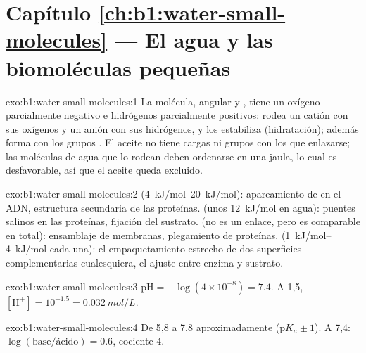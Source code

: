 \section*{Capítulo \ref{ch:b1:water-small-molecules} --- El agua y las biomoléculas pequeñas}

\begin{solution}{exo:b1:water-small-molecules:1}
La molécula, angular y , tiene un oxígeno parcialmente negativo e
hidrógenos parcialmente positivos: rodea un catión con sus oxígenos y un
anión con sus hidrógenos, y los estabiliza (hidratación); además forma
 con los grupos . El aceite no tiene cargas ni
grupos  con los que enlazarse; las moléculas de agua que lo rodean
deben ordenarse en una jaula, lo cual es desfavorable, así que el aceite
queda excluido.
\end{solution}

\begin{solution}{exo:b1:water-small-molecules:2}
 (\qtyrange{4}{20}{kJ/mol}): apareamiento de  en el
ADN, estructura secundaria de las proteínas.  (unos
\qty{12}{kJ/mol} en agua): puentes salinos en las proteínas, fijación del
sustrato.  (no es un enlace, pero es comparable en total):
ensamblaje de membranas, plegamiento de proteínas. 
(\qtyrange{1}{4}{kJ/mol} cada una): el empaquetamiento estrecho de dos
superficies complementarias cualesquiera, el ajuste entre enzima y
sustrato.
\end{solution}

\begin{solution}{exo:b1:water-small-molecules:3}
$\mathrm{pH} = -\log(4\times 10^{-8}) = 7.4$. A  1,5,
$[\mathrm{H^+}] = 10^{-1.5} = \qty{0.032}{mol/L}$.
\end{solution}

\begin{solution}{exo:b1:water-small-molecules:4}
De 5,8 a 7,8 aproximadamente (p$K_a \pm 1$). A 7,4:
$\log(\text{base}/\text{ácido})
= 0.6$, cociente $4$.
\end{solution}

